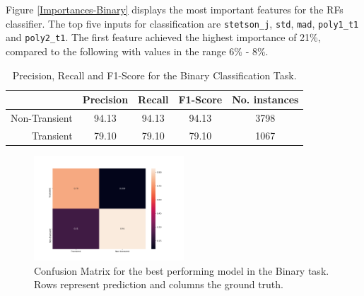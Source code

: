 \documentclass[usenatbib]{mnras}
\begin{document}
Figure \ref{Importances-Binary} displays the most important features
for the RFs classifier.
The top five inputs for classification are \texttt{stetson\_j},
\texttt{std}, \texttt{mad}, \texttt{poly1\_t1} and \texttt{poly2\_t1}.  
The first feature achieved the highest importance of 21\%, compared to
the following with values in the range 6\% - 8\%.  


\begin{table}
\centering
\begin{tabular}{|r|c|c|c|c|}
\hline
\multicolumn{1}{|l|}{} & Precision & Recall & F1-Score & No. instances \\ \hline \hline
Non-Transient          & 94.13     & 94.13      & 94.13      & 3798   \\ \hline
Transient              & 79.10     & 79.10      & 79.10      & 1067    \\ \hline
\end{tabular}
\caption{Precision, Recall and F1-Score for the Binary Classification Task.}
\label{Overall-Scores-Binary}
\end{table}


\begin{figure}
	\includegraphics[width=0.5\textwidth]{normalizedCMBinary.png}
  \caption{Confusion Matrix for the best performing model in the Binary task. Rows represent prediction and columns the ground truth.}
  \label{fig:normalizedBinaryCM}
\end{figure} 
\end{document}
